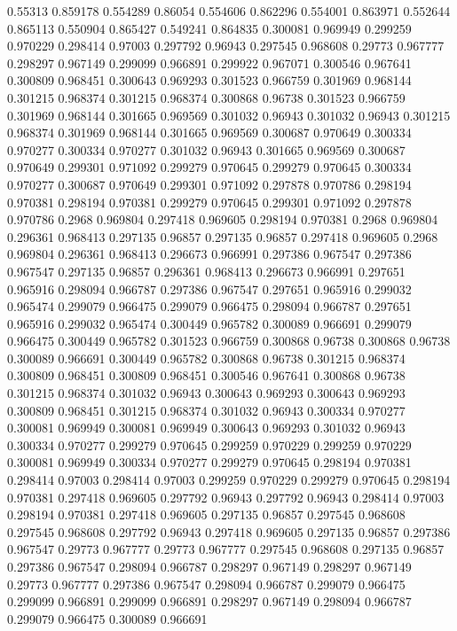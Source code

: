 0.55313 0.859178
0.554289 0.86054
0.554606 0.862296
0.554001 0.863971
0.552644 0.865113
0.550904 0.865427
0.549241 0.864835
0.300081 0.969949
0.299259 0.970229
0.298414 0.97003
0.297792 0.96943
0.297545 0.968608
0.29773 0.967777
0.298297 0.967149
0.299099 0.966891
0.299922 0.967071
0.300546 0.967641
0.300809 0.968451
0.300643 0.969293
0.301523 0.966759
0.301969 0.968144
0.301215 0.968374
0.301215 0.968374
0.300868 0.96738
0.301523 0.966759
0.301969 0.968144
0.301665 0.969569
0.301032 0.96943
0.301032 0.96943
0.301215 0.968374
0.301969 0.968144
0.301665 0.969569
0.300687 0.970649
0.300334 0.970277
0.300334 0.970277
0.301032 0.96943
0.301665 0.969569
0.300687 0.970649
0.299301 0.971092
0.299279 0.970645
0.299279 0.970645
0.300334 0.970277
0.300687 0.970649
0.299301 0.971092
0.297878 0.970786
0.298194 0.970381
0.298194 0.970381
0.299279 0.970645
0.299301 0.971092
0.297878 0.970786
0.2968 0.969804
0.297418 0.969605
0.298194 0.970381
0.2968 0.969804
0.296361 0.968413
0.297135 0.96857
0.297135 0.96857
0.297418 0.969605
0.2968 0.969804
0.296361 0.968413
0.296673 0.966991
0.297386 0.967547
0.297386 0.967547
0.297135 0.96857
0.296361 0.968413
0.296673 0.966991
0.297651 0.965916
0.298094 0.966787
0.297386 0.967547
0.297651 0.965916
0.299032 0.965474
0.299079 0.966475
0.299079 0.966475
0.298094 0.966787
0.297651 0.965916
0.299032 0.965474
0.300449 0.965782
0.300089 0.966691
0.299079 0.966475
0.300449 0.965782
0.301523 0.966759
0.300868 0.96738
0.300868 0.96738
0.300089 0.966691
0.300449 0.965782
0.300868 0.96738
0.301215 0.968374
0.300809 0.968451
0.300809 0.968451
0.300546 0.967641
0.300868 0.96738
0.301215 0.968374
0.301032 0.96943
0.300643 0.969293
0.300643 0.969293
0.300809 0.968451
0.301215 0.968374
0.301032 0.96943
0.300334 0.970277
0.300081 0.969949
0.300081 0.969949
0.300643 0.969293
0.301032 0.96943
0.300334 0.970277
0.299279 0.970645
0.299259 0.970229
0.299259 0.970229
0.300081 0.969949
0.300334 0.970277
0.299279 0.970645
0.298194 0.970381
0.298414 0.97003
0.298414 0.97003
0.299259 0.970229
0.299279 0.970645
0.298194 0.970381
0.297418 0.969605
0.297792 0.96943
0.297792 0.96943
0.298414 0.97003
0.298194 0.970381
0.297418 0.969605
0.297135 0.96857
0.297545 0.968608
0.297545 0.968608
0.297792 0.96943
0.297418 0.969605
0.297135 0.96857
0.297386 0.967547
0.29773 0.967777
0.29773 0.967777
0.297545 0.968608
0.297135 0.96857
0.297386 0.967547
0.298094 0.966787
0.298297 0.967149
0.298297 0.967149
0.29773 0.967777
0.297386 0.967547
0.298094 0.966787
0.299079 0.966475
0.299099 0.966891
0.299099 0.966891
0.298297 0.967149
0.298094 0.966787
0.299079 0.966475
0.300089 0.966691
